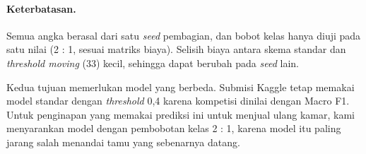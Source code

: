 \paragraph{Keterbatasan.} Semua angka berasal dari satu \textit{seed} pembagian, dan bobot kelas hanya
diuji pada satu nilai (2 : 1, sesuai matriks biaya). Selisih biaya antara skema standar dan
\textit{threshold moving} (33) kecil, sehingga dapat berubah pada \textit{seed} lain.

Kedua tujuan memerlukan model yang berbeda. Submisi Kaggle tetap memakai model standar dengan
\textit{threshold} 0,4 karena kompetisi dinilai dengan Macro F1. Untuk penginapan yang memakai
prediksi ini untuk menjual ulang kamar, kami menyarankan model dengan pembobotan kelas 2 : 1, karena
model itu paling jarang salah menandai tamu yang sebenarnya datang.
